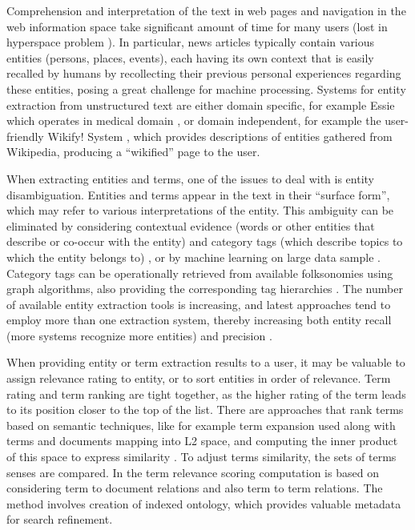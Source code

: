 \documentclass{llncs}%
\begin{document}
Comprehension and interpretation of the text in web pages and navigation in the web information space take significant amount of time for many users (lost in hyperspace problem \cite{otter2000lost}).%
In particular, news articles typically contain various entities (persons, places, events), each having its own context that is easily recalled by humans by recollecting their previous personal experiences regarding these entities, posing a great challenge for machine processing. Systems for entity extraction from unstructured text are either domain specific, for example Essie which operates in medical domain \cite{ide2007essie}, or domain independent, for example the user-friendly Wikify! System \cite{mihalcea2007wikify}, which provides descriptions of entities gathered from Wikipedia, producing a “wikified” page to the user. 

When extracting entities and terms, one of the issues to deal with is entity disambiguation. Entities and terms appear in the text in their “surface form”, which may refer to various interpretations of the entity. This ambiguity can be eliminated by considering contextual evidence (words or other entities that describe or co-occur with the entity) and category tags (which describe topics to which the entity belongs to) \cite{cucerzan2007large}, or by machine learning on large data sample \cite{milne2008learning}. Category tags can be operationally retrieved from available folksonomies using graph algorithms, also providing the corresponding tag hierarchies \cite{barla2009deriving}. The number of available entity extraction tools is increasing, and latest approaches tend to employ more than one extraction system, thereby increasing both entity recall (more systems recognize more entities) and precision \cite{iacobelli2010tell}. 

When providing entity or term extraction results to a user, it may be valuable to assign relevance rating to entity, or to sort entities in order of relevance. Term rating and term ranking are tight together, as the higher rating of the term leads to its position closer to the top of the list. There are approaches that rank terms based on semantic techniques, like for example term expansion used along with terms and documents mapping into L2 space, and computing the inner product of this space to express similarity \cite{wittek2009improving}. To adjust terms similarity, the sets of terms senses are compared. In \cite{vsimko2009improving} the term relevance scoring computation is based on considering term to document relations and also term to term relations. The method involves creation of indexed ontology, which provides valuable metadata for search refinement. 
\end{document}
